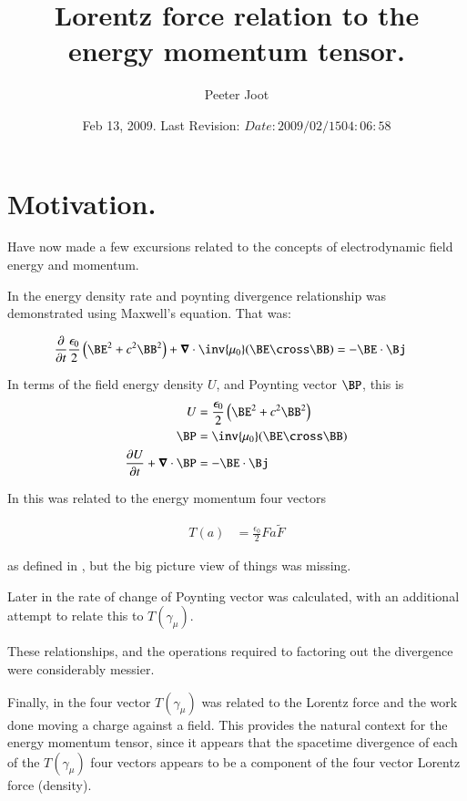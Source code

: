 \documentclass{article}
\title{ Lorentz force relation to the energy momentum tensor. }
\author{Peeter Joot}
\date{ Feb 13, 2009.  Last Revision: $Date: 2009/02/15 04:06:58 $ }
\begin{document}
\maketitle{}

\tableofcontents

\section{ Motivation. }

Have now made a few excursions related to the concepts of electrodynamic
field energy and momentum.

In \cite{PJpoynting} the energy density rate and poynting divergence 
relationship was demonstrated using Maxwell's equation.  That was:

\begin{align}
\PD{t}{}\frac{\epsilon_0}{2} \left(\BE^2 + c^2 \BB^2\right) + \spacegrad \cdot \inv{\mu_0}(\BE \cross \BB) &= -\BE \cdot \Bj 
\end{align}

In terms of the field energy density $U$, and Poynting vector $\BP$, this is
\begin{align}\label{eqn:energyDensityPoyntingDefined}
U &= \frac{\epsilon_0}{2} \left(\BE^2 + c^2 \BB^2\right) \\
\BP &= \inv{\mu_0}(\BE \cross \BB) \\
\PD{t}{U} + \spacegrad \cdot \BP &= -\BE \cdot \Bj 
\end{align}

In \cite{PJemstresstensor} this was related to the 
energy momentum four vectors

\begin{align}
T(a) &= \frac{\epsilon_0}{2} F a \tilde{F}
\end{align}

as defined
in \cite{doran2003gap}, but the big picture view 
of things was missing.

Later in \cite{PJpoyntingRate} the rate of change of Poynting vector
was calculated, with an additional attempt to relate this to $T(\gamma_\mu)$.

These relationships, and the operations required to factoring out the divergence were considerably messier.

Finally, in \cite{PJelectricFieldEnergy} the four vector $T(\gamma_\mu)$
was related to the Lorentz force and the work done moving a charge against
a field.  This provides the natural context for the energy momentum tensor, 
since it appears that the spacetime divergence of each of the
$T(\gamma_\mu)$ four vectors appears to be a component of the
four vector Lorentz force (density).  
\end{document}
